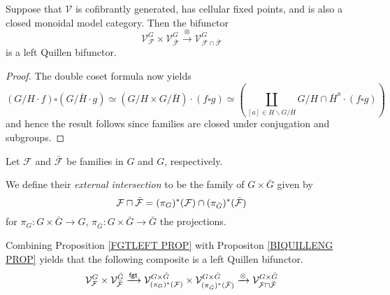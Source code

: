 \documentclass[a4paper,10pt]{article}%
\begin{document}
\begin{proposition}\label{BIQUILLENG PROP}
	Suppose that $\mathcal{V}$ is cofibrantly generated, has cellular fixed points, and is also a closed monoidal model category. 	
	Then the bifunctor
\begin{equation}\label{BIQUILLENG EQ}
	\mathcal{V}^G_{\mathcal{F}}
		\times
	\mathcal{V}^G_{\bar{\mathcal{F}}}
		\xrightarrow{\otimes}
	\mathcal{V}^G_{\mathcal{F} \cap \bar{\mathcal{F}}}
\end{equation}
	is a left Quillen bifunctor.
\end{proposition}


\begin{proof}
	The double coset formula now yields
\begin{equation}
	\left(G/H \cdot f\right) \square \left(G/\bar{H} \cdot g\right)
		\simeq
	\left(G/H \times G/\bar{H}\right) \cdot \left(f \square g\right)
		\simeq
	\left(
		\coprod_{[a]\in H \backslash G /\bar{H}}
		{G/H\cap \bar{H}^a} \cdot (f \square g)
	\right)
\end{equation}
and hence the result follows since families are closed under conjugation and subgroups.
\end{proof}


\begin{definition}\label{EXTERINT DEF}
Let $\mathcal{F}$ and $\bar{\mathcal{F}}$ be families in $G$ and $G$, respectively.

We define their \textit{external intersection} to be the 
family of $G \times \bar{G}$ given by
\[
	\mathcal{F} \sqcap \bar{\mathcal{F}}
=
	(\pi_{G})^{\**} (\mathcal{F}) 
		\cap
	(\pi_{\bar{G}})^{\**} (\bar{\mathcal{F}})
\]
for 
$\pi_G \colon G \times \bar{G} \to G$,
$\pi_{\bar{G}} \colon G \times \bar{G} \to \bar{G}$
the projections.
\end{definition}


\begin{remark}
	Combining Proposition \ref{FGTLEFT PROP} 
	with Propositon \ref{BIQUILLENG PROP} yields that
	the following composite is a left Quillen bifunctor.
\begin{equation}\label{EXTERINTADJ EQ}
	\mathcal{V}^{G}_{\mathcal{F}}
		\times
	\mathcal{V}^{\bar{G}}_{\bar{\mathcal{F}}}
		\xrightarrow{\mathsf{fgt}}
	\mathcal{V}^{G \times \bar{G}}_{
	(\pi_G)^{\**}(\mathcal{F})}
		\times
	\mathcal{V}^{G \times \bar{G}}_{
	(\pi_{\bar{G}})^{\**}(\bar{\mathcal{F}})}
		\xrightarrow{\otimes}
	\mathcal{V}^{G \times \bar{G}}_{
	\mathcal{F} \sqcap \bar{\mathcal{F}}}
\end{equation}
\end{remark}
\end{document}
